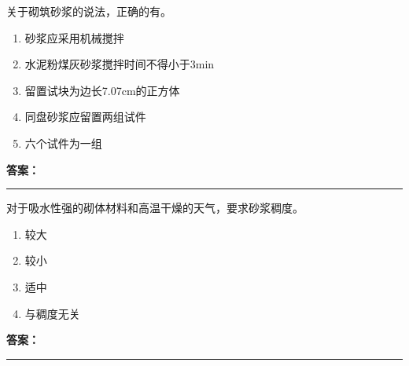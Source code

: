 \documentclass[UTF8,fontset=fandol,11pt]{ctexart}
\newcommand{\answerline}{\textcolor{answerred}{\rule{2.4cm}{0.7pt}}}
\begin{document}
\begin{quizbox}[title={乱序第 62 题｜第六章砌筑工程}]

关于砌筑砂浆的说法，正确的有。\\

\begin{enumerate}[label=\Alph*.]

\item 砂浆应采用机械搅拌

\item 水泥粉煤灰砂浆搅拌时间不得小于3min

\item 留置试块为边长7.07cm的正方体

\item 同盘砂浆应留置两组试件

\item 六个试件为一组

\end{enumerate}

\textbf{\textcolor{answerred}{答案：}} \answerline

\end{quizbox}

\vspace{0.2em}

\begin{quizbox}[title={乱序第 63 题｜第六章砌筑工程}]

对于吸水性强的砌体材料和高温干燥的天气，要求砂浆稠度。\\

\begin{enumerate}[label=\Alph*.]

\item 较大

\item 较小

\item 适中

\item 与稠度无关

\end{enumerate}

\textbf{\textcolor{answerred}{答案：}} \answerline

\end{quizbox}

\vspace{0.2em}
\end{document}
